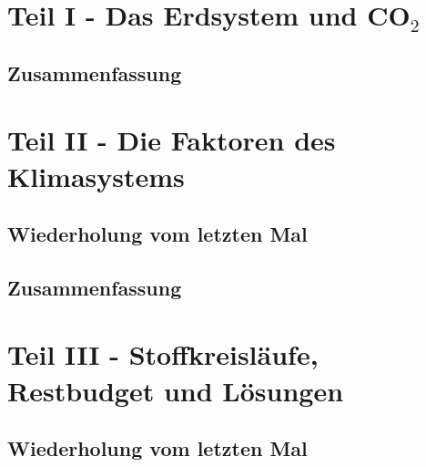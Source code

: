 	\section{Teil I - Das Erdsystem und CO$_2$}
	
	
	
	
	\subsection{Zusammenfassung}
	
	\section{Teil II - Die Faktoren des Klimasystems}
	\subsection{Wiederholung vom letzten Mal}
	
	
	\subsection{Zusammenfassung}
	
	\section{Teil III - Stoffkreisläufe, Restbudget und Lösungen}
	\subsection{Wiederholung vom letzten Mal}
	
	
	
	
	
	
	


